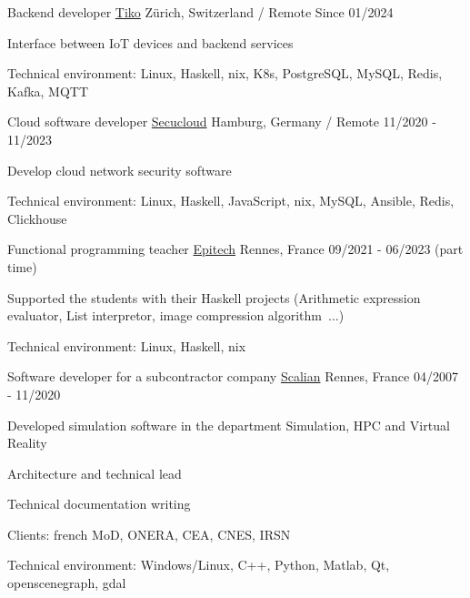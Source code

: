 \begin{cventries}
  \cventry
    {Backend developer}
    {\href{https://www.tiko.fr/}{Tiko}}
    {Zürich, Switzerland / Remote}
    {Since 01/2024}
    {
      \begin{cvitems}
        \item {Interface between IoT devices and backend services}
        \item {Technical environment: Linux, Haskell, nix, K8s, PostgreSQL, 
            MySQL, Redis, Kafka, MQTT}
      \end{cvitems}
    }

  \cventry
    {Cloud software developer}
    {\href{https://www.linkedin.com/company/secucloud/}{Secucloud}}
    {Hamburg, Germany / Remote}
    {11/2020 - 11/2023}
    {
      \begin{cvitems}
        \item {Develop cloud network security software}
        \item {Technical environment: Linux, Haskell, JavaScript, nix,
            MySQL, Ansible, Redis, Clickhouse}
      \end{cvitems}
    }

  \cventry
    {Functional programming teacher}
    {\href{https://www.epitech.eu/}{Epitech}}
    {Rennes, France}
    {09/2021 - 06/2023 (part time)}
    {
      \begin{cvitems}
          \item {Supported the students with their Haskell projects
              (Arithmetic expression evaluator, List interpretor, image
              compression algorithm~...)}
          \item {Technical environment: Linux, Haskell, nix}
      \end{cvitems}
    }

  \cventry
    {Software developer for a subcontractor company}
    {\href{https://www.scalian.com/}{Scalian}}
    {Rennes, France}
    {04/2007 - 11/2020}
    {
      \begin{cvitems}
        \item {Developed simulation software in the department Simulation, HPC
            and Virtual Reality}
        \item {Architecture and technical lead}
        \item {Technical documentation writing}
        \item {Clients: french MoD, ONERA, CEA, CNES, IRSN}
        \item {Technical environment: Windows/Linux, C++, Python, Matlab, Qt,
            openscenegraph, gdal}
      \end{cvitems}
    }


\end{cventries}
